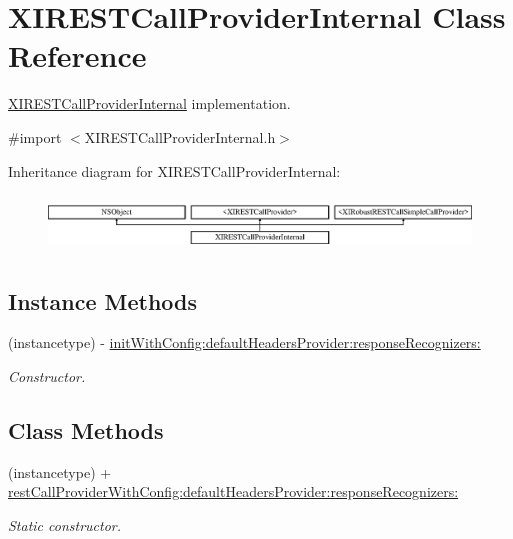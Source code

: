 \hypertarget{interface_x_i_r_e_s_t_call_provider_internal}{}\section{X\+I\+R\+E\+S\+T\+Call\+Provider\+Internal Class Reference}
\label{interface_x_i_r_e_s_t_call_provider_internal}


\hyperlink{interface_x_i_r_e_s_t_call_provider_internal}{X\+I\+R\+E\+S\+T\+Call\+Provider\+Internal} implementation.  




{\ttfamily \#import $<$X\+I\+R\+E\+S\+T\+Call\+Provider\+Internal.\+h$>$}

Inheritance diagram for X\+I\+R\+E\+S\+T\+Call\+Provider\+Internal\+:\begin{figure}[H]
\begin{center}
\leavevmode
\includegraphics[height=1.523810cm]{interface_x_i_r_e_s_t_call_provider_internal}
\end{center}
\end{figure}
\subsection*{Instance Methods}
\begin{DoxyCompactItemize}
\item 
(instancetype) -\/ \hyperlink{interface_x_i_r_e_s_t_call_provider_internal_ab7b1e2c7114d170d1efbb086da61984a}{init\+With\+Config\+:default\+Headers\+Provider\+:response\+Recognizers\+:}
\begin{DoxyCompactList}\small\item\em Constructor. \end{DoxyCompactList}\end{DoxyCompactItemize}
\subsection*{Class Methods}
\begin{DoxyCompactItemize}
\item 
(instancetype) + \hyperlink{interface_x_i_r_e_s_t_call_provider_internal_ae9dedfc4b1656ed0fff0e43cf6d7e0c9}{rest\+Call\+Provider\+With\+Config\+:default\+Headers\+Provider\+:response\+Recognizers\+:}
\begin{DoxyCompactList}\small\item\em Static constructor. \end{DoxyCompactList}\end{DoxyCompactItemize}


